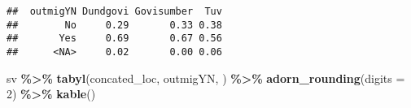 \documentclass[
]{article}
\newenvironment{Shaded}{\begin{snugshade}}{\end{snugshade}}
\newcommand{\AttributeTok}[1]{\textcolor[rgb]{0.13,0.29,0.53}{#1}}
\newcommand{\DecValTok}[1]{\textcolor[rgb]{0.00,0.00,0.81}{#1}}
\newcommand{\FunctionTok}[1]{\textcolor[rgb]{0.13,0.29,0.53}{\textbf{#1}}}
\newcommand{\NormalTok}[1]{#1}
\newcommand{\SpecialCharTok}[1]{\textcolor[rgb]{0.81,0.36,0.00}{\textbf{#1}}}
\begin{document}
\begin{verbatim}
##  outmigYN Dundgovi Govisumber  Tuv
##        No     0.29       0.33 0.38
##       Yes     0.69       0.67 0.56
##      <NA>     0.02       0.00 0.06
\end{verbatim}

\begin{Shaded}
\begin{Highlighting}[]
\NormalTok{sv }\SpecialCharTok{\%\textgreater{}\%} \FunctionTok{tabyl}\NormalTok{(concated\_loc, outmigYN, ) }\SpecialCharTok{\%\textgreater{}\%}
  \FunctionTok{adorn\_rounding}\NormalTok{(}\AttributeTok{digits =} \DecValTok{2}\NormalTok{) }\SpecialCharTok{\%\textgreater{}\%} 
  \FunctionTok{kable}\NormalTok{()}
\end{Highlighting}
\end{Shaded}
\end{document}
